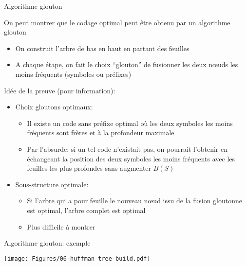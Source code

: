 \begin{frame}{Algorithme glouton}

On peut montrer que le codage optimal peut être obtenu par un
  algorithme glouton
\begin{itemize}
\item On construit l'arbre de bas en haut en partant des feuilles
\item A chaque étape, on fait le choix ``glouton'' de fusionner les deux n\oe uds les moins fréquents (symboles ou préfixes)
\end{itemize}

\bigskip

Idée de la preuve (pour information):
\begin{itemize}
\item Choix gloutons optimaux:
\begin{itemize}
\item Il existe un code sans préfixe optimal où les deux symboles les moins fréquents sont frères et à la profondeur maximale
\item Par l'absurde: si un tel code n'existait pas, on pourrait l'obtenir en échangeant la position des deux symboles les moins fréquents avec les feuilles les plus profondes sans augmenter $B(S)$
\end{itemize}
\item Sous-structure optimale:
\begin{itemize}
\item Si l'arbre qui a pour feuille le nouveau n\oe ud issu de la fusion gloutonne est optimal, l'arbre complet est optimal
\item Plus difficile à montrer
\end{itemize}
\end{itemize}

\end{frame}

\begin{frame}{Algorithme glouton: exemple}

\centerline{\texttt{[image: Figures/06-huffman-tree-build.pdf]}}

\end{frame}

